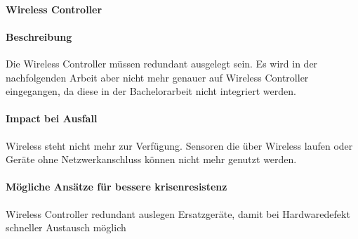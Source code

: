\paragraph{Wireless Controller}
\paragraph{Beschreibung}
Die Wireless Controller müssen redundant ausgelegt sein. Es wird in der nachfolgenden Arbeit aber nicht mehr genauer auf Wireless Controller eingegangen, da diese in der Bachelorarbeit nicht integriert werden.

\paragraph{Impact bei Ausfall}
Wireless steht nicht mehr zur Verfügung. Sensoren die über Wireless laufen oder Geräte ohne Netzwerkanschluss können nicht mehr genutzt werden.

\paragraph{Mögliche Ansätze für bessere krisenresistenz}
Wireless Controller redundant auslegen
Ersatzgeräte, damit bei Hardwaredefekt schneller Austausch möglich
